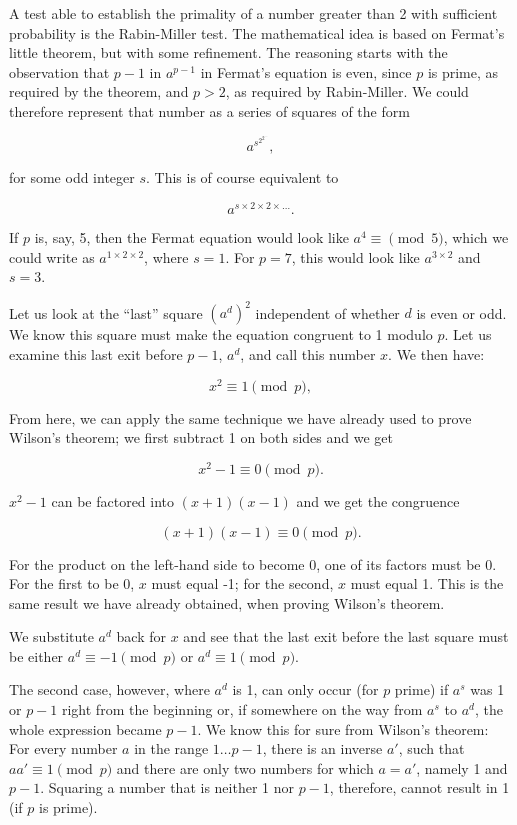 \documentclass{scrreprt}
\begin{document}
A test able to establish the primality of a number
greater than 2
with sufficient probability is the Rabin-Miller test.
The mathematical idea is based on Fermat's little theorem,
but with some refinement.
The reasoning starts with the observation
that $p-1$ in $a^{p-1}$ in Fermat's equation is even, 
since $p$ is prime, 
as required by the theorem, and $p > 2$,
as required by Rabin-Miller.
We could therefore represent that number as a series
of squares of the form

\[
a^{s^{2^{2^{...}}}}, 
\]

for some odd integer $s$.
This is of course equivalent to

\[
a^{s \times 2 \times 2 \times \dots}.
\]

If $p$ is, say, 5, then the Fermat equation
would look like $a^4 \equiv \pmod{5}$,
which we could write as $a^{1 \times 2\times 2}$,
where $s=1$.
For $p = 7$, this would look like $a^{3\times 2}$
and $s = 3$.

Let us look at the ``last'' square
$(a^d)^2$ independent of whether $d$ is even or odd.
We know this square must make the equation congruent
to 1 modulo $p$. Let us examine this last exit before $p-1$,
$a^d$, and call this number $x$.
We then have:

\[
x^2 \equiv 1 \pmod{p},
\]

From here, we can apply the same technique
we have already used to prove Wilson's theorem;
we first subtract 1 on both sides and we get

\[
x^2 - 1 \equiv 0 \pmod{p}.
\]

$x^2 - 1$ can be factored into
$(x+1)(x-1)$ and we get the congruence

\[
(x + 1)(x - 1) \equiv 0 \pmod{p}.
\]

For the product on the left-hand side to become 0,
one of its factors must be 0. For the first to be 0,
$x$ must equal -1; for the second, $x$ must equal 1.
This is the same result we have already obtained,
when proving Wilson's theorem.

We substitute $a^d$ back for $x$ and see 
that the last exit before the last square
must be either 
$a^d \equiv -1 \pmod{p}$ or 
$a^d \equiv  1 \pmod{p}$.

The second case, however, where $a^d$ is 1,
can only occur (for $p$ prime)
if $a^s$ was 1 or $p-1$ right from the beginning
or, if somewhere on the way from $a^s$ to $a^d$,
the whole expression became $p-1$.
We know this for sure from Wilson's theorem:
For every number $a$ in the range $1\dots p-1$,
there is an inverse $a'$, such that $aa' \equiv 1 \pmod{p}$
and there are only two numbers for which $a = a'$,
namely 1 and $p-1$.
Squaring a number that is neither 1 nor $p-1$, therefore,
cannot result in 1 (if $p$ is prime).
\end{document}
